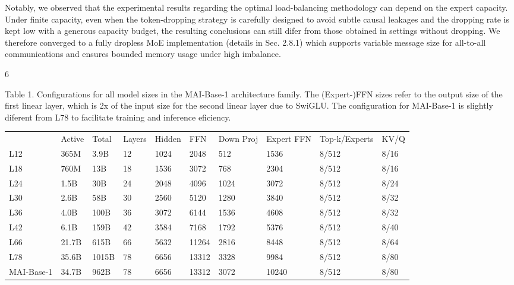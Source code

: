 \documentclass[
  10
]{article}
\newcounter{none} %
\begin{document}
Notably, we observed that the experimental results regarding the optimal
load-balancing methodology can depend on the expert capacity. Under
finite capacity, even when the token-dropping strategy is carefully
designed to avoid subtle causal leakages and the dropping rate is kept
low with a generous capacity budget, the resulting conclusions can still
difer from those obtained in settings without dropping. We therefore
converged to a fully dropless MoE implementation (details in Sec. 2.8.1)
which supports variable message size for all-to-all communications and
ensures bounded memory usage under high imbalance.

6

Table 1. Configurations for all model sizes in the MAI-Base-1
architecture family. The (Expert-)FFN sizes refer to the output size of
the first linear layer, which is 2x of the input size for the second
linear layer due to SwiGLU. The configuration for MAI-Base-1 is slightly
diferent from L78 to facilitate training and inference eficiency.

{\def\LTcaptype{none} %
\begin{longtable}[]{@{}llllllllll@{}}
\toprule\noalign{}
\endhead
\bottomrule\noalign{}
\endlastfoot
\multirow{2}{*}{Model} & \multirow{2}{*}{Active} &
\multirow{2}{*}{Total} & \multirow{2}{*}{Layers} &
\multirow{2}{*}{Hidden} & \multirow{2}{*}{FFN} & \multirow{2}{*}{Down
Proj} & \multirow{2}{*}{Expert FFN} & \multirow{2}{*}{Top-k/Experts} &
\multirow{2}{*}{KV/Q} \\
 \\
L12 & 365M & 3.9B & 12 & 1024 & 2048 & 512 & 1536 & 8/512 & 8/16 \\
L18 & 760M & 13B & 18 & 1536 & 3072 & 768 & 2304 & 8/512 & 8/16 \\
L24 & 1.5B & 30B & 24 & 2048 & 4096 & 1024 & 3072 & 8/512 & 8/24 \\
L30 & 2.6B & 58B & 30 & 2560 & 5120 & 1280 & 3840 & 8/512 & 8/32 \\
L36 & 4.0B & 100B & 36 & 3072 & 6144 & 1536 & 4608 & 8/512 & 8/32 \\
L42 & 6.1B & 159B & 42 & 3584 & 7168 & 1792 & 5376 & 8/512 & 8/40 \\
L66 & 21.7B & 615B & 66 & 5632 & 11264 & 2816 & 8448 & 8/512 & 8/64 \\
L78 & 35.6B & 1015B & 78 & 6656 & 13312 & 3328 & 9984 & 8/512 & 8/80 \\
MAI-Base-1 & 34.7B & 962B & 78 & 6656 & 13312 & 3072 & 10240 & 8/512 &
8/80 \\
\end{longtable}
}
\end{document}
